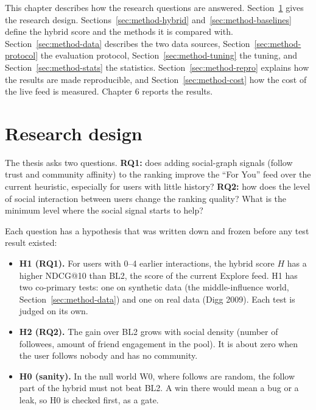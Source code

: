 
This chapter describes how the research questions are answered. Section~\ref{sec:method-design} gives the research design. Sections~\ref{sec:method-hybrid} and~\ref{sec:method-baselines} define the hybrid score and the methods it is compared with. Section~\ref{sec:method-data} describes the two data sources, Section~\ref{sec:method-protocol} the evaluation protocol, Section~\ref{sec:method-tuning} the tuning, and Section~\ref{sec:method-stats} the statistics. Section~\ref{sec:method-repro} explains how the results are made reproducible, and Section~\ref{sec:method-cost} how the cost of the live feed is measured. Chapter 6 reports the results.

\section{Research design}
\label{sec:method-design}

The thesis asks two questions. \textbf{RQ1:} does adding social-graph signals (follow trust and community affinity) to the ranking improve the ``For You'' feed over the current heuristic, especially for users with little history? \textbf{RQ2:} how does the level of social interaction between users change the ranking quality? What is the minimum level where the social signal starts to help?

Each question has a hypothesis that was written down and frozen before any test result existed:
\begin{itemize}
  \item \textbf{H1 (RQ1).} For users with 0--4 earlier interactions, the hybrid score $H$ has a higher NDCG@10 than BL2, the score of the current Explore feed. H1 has two co-primary tests: one on synthetic data (the middle-influence world, Section~\ref{sec:method-data}) and one on real data (Digg 2009). Each test is judged on its own.
  \item \textbf{H2 (RQ2).} The gain over BL2 grows with social density (number of followees, amount of friend engagement in the pool). It is about zero when the user follows nobody and has no community.
  \item \textbf{H0 (sanity).} In the null world W0, where follows are random, the follow part of the hybrid must not beat BL2. A win there would mean a bug or a leak, so H0 is checked first, as a gate.
\end{itemize}

